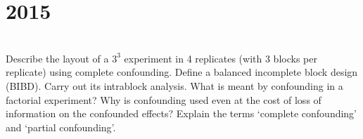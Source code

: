 \section*{2015}
\vspace{-.5cm}
\hrulefill \smallskip\\
 Describe the layout of a $3^3$ experiment in 4 replicates (with 3 blocks per replicate) using complete confounding.
\myline
{} Define a balanced incomplete block design (BIBD). Carry out its intrablock analysis.
\myline
{} What is meant by confounding in a factorial experiment? Why is confounding used even at the cost of loss of information on the confounded effects? Explain the terms `complete confounding' and `partial confounding'.